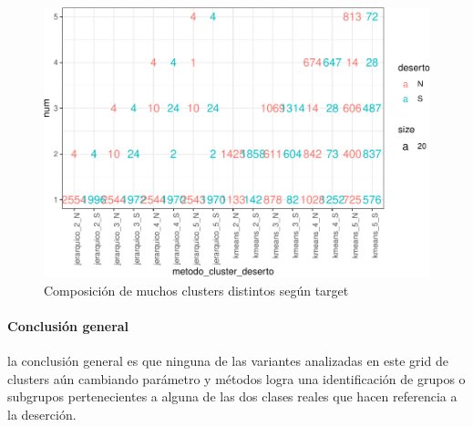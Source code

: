 \begin{figure}[!htb]
	\centering
	\includegraphics{imagenes/modelo_clusters/unnamed-chunk-25-1.pdf}
	\caption{Composición de muchos clusters distintos según target}
	\label{fig:muchos_clusters}
\end{figure}


\paragraph{\textbf{Conclusión general}}
la conclusión general es que ninguna de las variantes analizadas en este grid de clusters aún cambiando parámetro y métodos logra una identificación de grupos o subgrupos pertenecientes a alguna de las dos clases reales que hacen referencia a la deserción.\\





